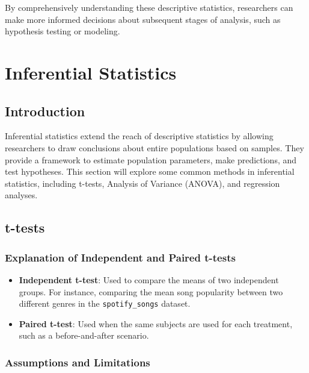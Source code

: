 \documentclass[
  b5paper]{book}
\begin{document}
By comprehensively understanding these descriptive statistics, researchers can make more informed decisions about subsequent stages of analysis, such as hypothesis testing or modeling.

\hypertarget{inferential-statistics-1}{%
\section{Inferential Statistics}\label{inferential-statistics-1}}

\hypertarget{introduction-9}{%
\subsection{Introduction}\label{introduction-9}}

Inferential statistics extend the reach of descriptive statistics by allowing researchers to draw conclusions about entire populations based on samples. They provide a framework to estimate population parameters, make predictions, and test hypotheses. This section will explore some common methods in inferential statistics, including t-tests, Analysis of Variance (ANOVA), and regression analyses.

\hypertarget{t-tests}{%
\subsection{t-tests}\label{t-tests}}

\hypertarget{explanation-of-independent-and-paired-t-tests}{%
\subsubsection{Explanation of Independent and Paired t-tests}\label{explanation-of-independent-and-paired-t-tests}}

\begin{itemize}
\item
  \textbf{Independent t-test}: Used to compare the means of two independent groups. For instance, comparing the mean song popularity between two different genres in the \texttt{spotify\_songs} dataset.
\item
  \textbf{Paired t-test}: Used when the same subjects are used for each treatment, such as a before-and-after scenario.
\end{itemize}

\hypertarget{assumptions-and-limitations}{%
\subsubsection{Assumptions and Limitations}\label{assumptions-and-limitations}}
\end{document}
